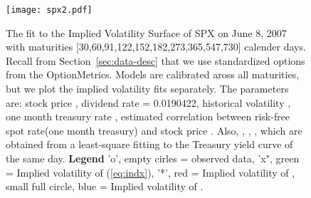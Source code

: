 \documentclass[11pt]{article}
\numberwithin{equation}{section}
\begin{document}
\begin{figure}[hb]
\begin{center}
\texttt{[image: spx2.pdf]}
\caption{The fit to the Implied Volatility Surface of SPX on June 8, 2007 with
maturities [30,60,91,122,152,182,273,365,547,730] calender days. Recall from Section~\ref{sec:data-desc} that we use standardized options from the OptionMetrics.
\newline
Models are calibrated aross all maturities, but we plot the implied volatility fits separately.
The parameters are:
stock price ,
dividend rate = 0.0190422, historical volatility , one month treasury rate , estimated correlation between risk-free spot 
rate(one month treasury) and stock price .
Also, 
, 
,
, which
 are obtained from a least-square fitting to the Treasury
yield curve of the same day.
\newline
\textbf{Legend} \newline
'o', empty cirles = observed data, \newline
'x", green = Implied volatility of (\ref{eq:indx}), \newline
'*', red = Implied volatility of \cite{ronnie-timescale}, \newline
small full circle, blue = Implied volatility of \cite{sircar}.}
\label{fig:spx}
\end{center}
\end{figure}
\end{document}
